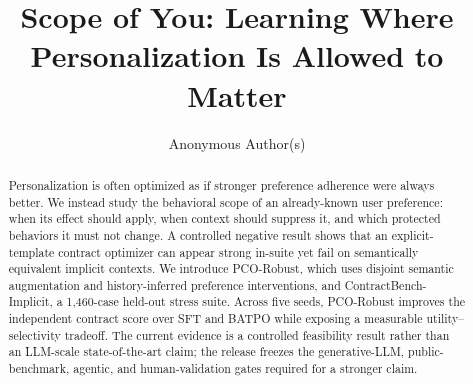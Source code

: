 \documentclass{article}
\title{Scope of You: Learning Where Personalization Is Allowed to Matter}
\author{Anonymous Author(s)}
\begin{document}
\maketitle
\begin{abstract}
Personalization is often optimized as if stronger preference adherence were always better. We instead study the behavioral scope of an already-known user preference: when its effect should apply, when context should suppress it, and which protected behaviors it must not change. A controlled negative result shows that an explicit-template contract optimizer can appear strong in-suite yet fail on semantically equivalent implicit contexts. We introduce PCO-Robust, which uses disjoint semantic augmentation and history-inferred preference interventions, and ContractBench-Implicit, a 1,460-case held-out stress suite. Across five seeds, PCO-Robust improves the independent contract score over SFT and BATPO while exposing a measurable utility--selectivity tradeoff. The current evidence is a controlled feasibility result rather than an LLM-scale state-of-the-art claim; the release freezes the generative-LLM, public-benchmark, agentic, and human-validation gates required for a stronger claim.
\end{abstract}

\end{document}
